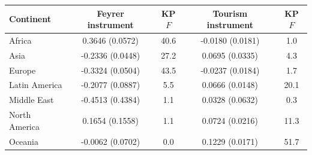 \begin{tabular}{lcccc}
\toprule
Continent & Feyrer instrument & KP $F$ & Tourism instrument & KP $F$ \\
\midrule
Africa & 0.3646\sym{***} (0.0572) & 40.6 & -0.0180 (0.0181) & 1.0 \\
Asia & -0.2336\sym{***} (0.0448) & 27.2 & 0.0695\sym{**} (0.0335) & 4.3 \\
Europe & -0.3324\sym{***} (0.0504) & 43.5 & -0.0237 (0.0184) & 1.7 \\
Latin America & -0.2077\sym{**} (0.0887) & 5.5 & 0.0666\sym{***} (0.0148) & 20.1 \\
Middle East & -0.4513 (0.4384) & 1.1 & 0.0328 (0.0632) & 0.3 \\
North America & 0.1654 (0.1558) & 1.1 & 0.0724\sym{***} (0.0216) & 11.3 \\
Oceania & -0.0062 (0.0702) & 0.0 & 0.1229\sym{***} (0.0171) & 51.7 \\
\bottomrule
\end{tabular}
